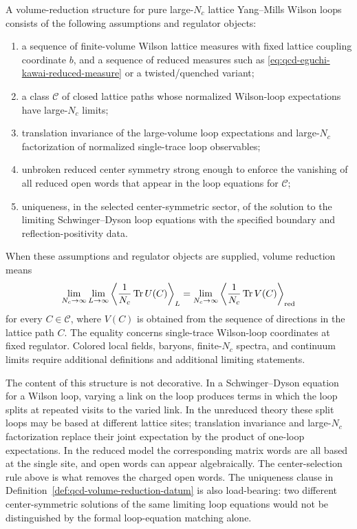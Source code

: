 \begin{definition}
\label{def:qcd-volume-reduction-datum}
A volume-reduction structure for pure large-\(N_c\) lattice Yang--Mills Wilson
loops consists of the following assumptions and regulator objects:
\begin{enumerate}
\item a sequence of finite-volume Wilson lattice measures with fixed lattice
coupling coordinate \(b\), and a sequence of reduced measures such as
\eqref{eq:qcd-eguchi-kawai-reduced-measure} or a twisted/quenched variant;
\item a class \(\mathcal C\) of closed lattice paths whose normalized
Wilson-loop expectations have large-\(N_c\) limits;
\item translation invariance of the large-volume loop expectations and
large-\(N_c\) factorization of normalized single-trace loop observables;
\item unbroken reduced center symmetry strong enough to enforce the vanishing
of all reduced open words that appear in the loop equations for
\(\mathcal C\);
\item uniqueness, in the selected center-symmetric sector, of the solution to
the limiting Schwinger--Dyson loop equations with the specified boundary and
reflection-positivity data.
\end{enumerate}
When these assumptions and regulator objects are supplied, volume reduction means
\begin{equation}
  \lim_{N_c\to\infty}\lim_{L\to\infty}
  \left\langle\frac1{N_c}\operatorname{Tr}U(C)\right\rangle_L
  =
  \lim_{N_c\to\infty}
  \left\langle\frac1{N_c}\operatorname{Tr}V(C)\right\rangle_{\rm red}
  \label{eq:qcd-volume-reduction-loop-equality}
\end{equation}
for every \(C\in\mathcal C\), where \(V(C)\) is obtained from the sequence of
directions in the lattice path \(C\).  The equality concerns single-trace
Wilson-loop coordinates at fixed regulator.  Colored local fields, baryons,
finite-\(N_c\) spectra, and continuum limits require additional definitions
and additional limiting statements.
\end{definition}

The content of this structure is not decorative.  In a Schwinger--Dyson equation
for a Wilson loop, varying a link on the loop produces terms in which the loop
splits at repeated visits to the varied link.  In the unreduced theory these
split loops may be based at different lattice sites; translation invariance
and large-\(N_c\) factorization replace their joint expectation by the product
of one-loop expectations.  In the reduced model the corresponding matrix words
are all based at the single site, and open words can appear algebraically.
The center-selection rule above is what removes the charged open words.  The
uniqueness clause in
Definition~\ref{def:qcd-volume-reduction-datum} is also load-bearing: two
different center-symmetric solutions of the same limiting loop equations would
not be distinguished by the formal loop-equation matching alone.

